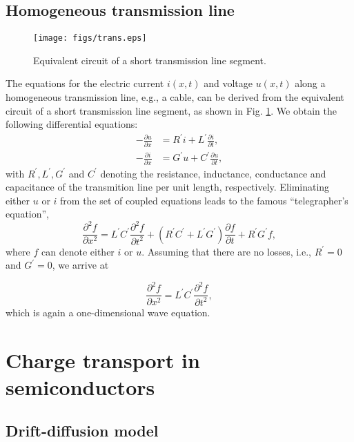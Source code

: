 \subsection{Homogeneous transmission line}

\begin{figure}[ptbh]
\centering\texttt{[image: figs/trans.eps]}\caption{Equivalent
circuit of a short transmission line segment.}%
\label{fig:trans}%
\end{figure}

The equations for the electric current $i(x,t)$ and voltage $u(x,t)$ along a
homogeneous transmission line, e.g., a cable, can be derived from the
equivalent circuit of a short transmission line segment, as shown in Fig.
\ref{fig:trans}. We obtain the following differential equations:
\begin{align}
-\frac{\partial u}{\partial x}  &  =R^{\prime}i+L^{\prime}\frac{\partial
i}{\partial t},\\
-\frac{\partial i}{\partial x}  &  =G^{\prime}u+C^{\prime}\frac{\partial
u}{\partial t},
\end{align}
with $R^{\prime},L^{\prime},G^{\prime}$ and $C^{\prime}$ denoting the
resistance, inductance, conductance and capacitance of the transmition line
per unit length, respectively. Eliminating either $u$ or $i$ from the set of
coupled equations leads to the famous ``telegrapher's equation'',
\begin{equation}
\frac{\partial^{2}f}{\partial x^{2}}=L^{\prime}C^{\prime}\frac{\partial^{2}%
f}{\partial t^{2}}+(R^{\prime}C^{\prime}+L^{\prime}G^{\prime})\frac{\partial
f}{\partial t}+R^{\prime}G^{\prime}f, \label{eq:telegrapherequation}%
\end{equation}
where $f$ can denote either $i$ or $u$. Assuming that there are no losses,
i.e., $R^{\prime}=0$ and $G^{\prime}=0$, we arrive at%

\begin{equation}
\frac{\partial^{2}f}{\partial x^{2}}=L^{\prime}C^{\prime}\frac{\partial^{2}%
f}{\partial t^{2}},
\end{equation}
which is again a one-dimensional wave equation.

\section{Charge transport in semiconductors}

\subsection*{Drift-diffusion model}

